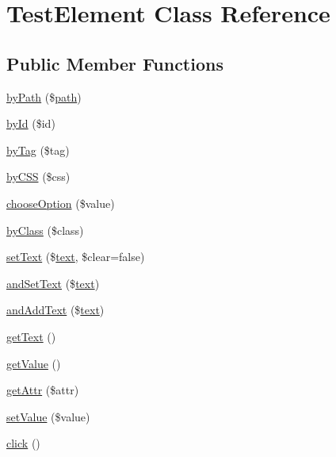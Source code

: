 \hypertarget{classTestElement}{}\section{Test\+Element Class Reference}
\label{classTestElement}
\subsection*{Public Member Functions}
\begin{DoxyCompactItemize}
\item 
\hyperlink{classTestElement_ac3025f8014dade5d754d3943689a396f}{by\+Path} (\$\hyperlink{Shape_8php_a3b05eec13add53df44e232273d718ae4}{path})
\item 
\hyperlink{classTestElement_a584de1c2c8c24eb790f493102bcb1fac}{by\+Id} (\$id)
\item 
\hyperlink{classTestElement_a46f9075b924f047895d576e0af82d9c9}{by\+Tag} (\$tag)
\item 
\hyperlink{classTestElement_aaf0f757cf4dfc5925d0db204bcb252d5}{by\+C\+S\+S} (\$css)
\item 
\hyperlink{classTestElement_a56ad09c49ee8c9781b8c50ab31d08b22}{choose\+Option} (\$value)
\item 
\hyperlink{classTestElement_a5211d65c1aa197f6dc1e22e24283abb2}{by\+Class} (\$class)
\item 
\hyperlink{classTestElement_ac5968c56cb813dba50a15b50946e5330}{set\+Text} (\$\hyperlink{Shape_8php_a37df362c2f77a0045fa8af094f432238}{text}, \$clear=false)
\item 
\hyperlink{classTestElement_a37b4de38664b658faa86ade0d7073dd4}{and\+Set\+Text} (\$\hyperlink{Shape_8php_a37df362c2f77a0045fa8af094f432238}{text})
\item 
\hyperlink{classTestElement_a7f2722947e83c9268799ab59294626bc}{and\+Add\+Text} (\$\hyperlink{Shape_8php_a37df362c2f77a0045fa8af094f432238}{text})
\item 
\hyperlink{classTestElement_a86c3a50de5a568d5ca9a75339ef1a417}{get\+Text} ()
\item 
\hyperlink{classTestElement_a1964043ed9be26b977b5ed6b4d993aaa}{get\+Value} ()
\item 
\hyperlink{classTestElement_ad9fd0dc7b25f15c78483e0710dea2d04}{get\+Attr} (\$attr)
\item 
\hyperlink{classTestElement_ae61d3f666ac5c098dec914bcb7fdeaf6}{set\+Value} (\$value)
\item 
\hyperlink{classTestElement_aa32acc6f9604f1fff02ecb37197627b3}{click} ()

\end{DoxyCompactItemize}
